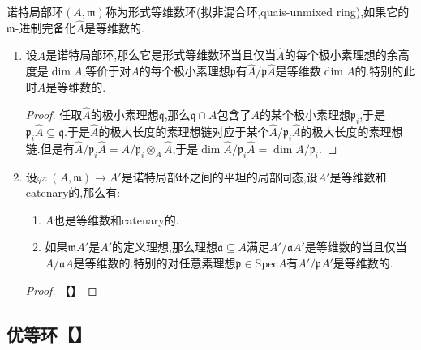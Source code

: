 诺特局部环$(A,\mathfrak{m})$称为形式等维数环(拟非混合环,quais-unmixed ring),如果它的$\mathfrak{m}$-进制完备化$\widehat{A}$是等维数的.
\begin{enumerate}
	\item 设$A$是诺特局部环,那么它是形式等维数环当且仅当$\widehat{A}$的每个极小素理想的余高度是$\dim A$,等价于对$A$的每个极小素理想$\mathfrak{p}$有$\widehat{A}/\mathfrak{p}\widehat{A}$是等维数$\dim A$的.特别的此时$A$是等维数的.
	\begin{proof}
		
		任取$\widehat{A}$的极小素理想$\mathfrak{q}$,那么$\mathfrak{q}\cap A$包含了$A$的某个极小素理想$\mathfrak{p}_i$,于是$\mathfrak{p}_i\widehat{A}\subseteq\mathfrak{q}$.于是$\widehat{A}$的极大长度的素理想链对应于某个$\widehat{A}/\mathfrak{p}_i\widehat{A}$的极大长度的素理想链.但是有$\widehat{A}/\mathfrak{p}_i\widehat{A}=A/\mathfrak{p}_i\otimes_A\widehat{A}$,于是$\dim\widehat{A}/\mathfrak{p}_i\widehat{A}=\dim A/\mathfrak{p}_i$.
	\end{proof}
	\item 设$\varphi:(A,\mathfrak{m})\to A'$是诺特局部环之间的平坦的局部同态,设$A'$是等维数和catenary的,那么有:
	\begin{enumerate}[(1)]
		\item $A$也是等维数和catenary的.
		\item 如果$\mathfrak{m}A'$是$A'$的定义理想,那么理想$\mathfrak{a}\subseteq A$满足$A'/\mathfrak{a}A'$是等维数的当且仅当$A/\mathfrak{a}A$是等维数的.特别的对任意素理想$\mathfrak{p}\in\mathrm{Spec}A$有$A'/\mathfrak{p}A'$是等维数的.
	\end{enumerate}
	\begin{proof}
		
		【】
		
	\end{proof}
\end{enumerate}
\subsection{优等环【】}

